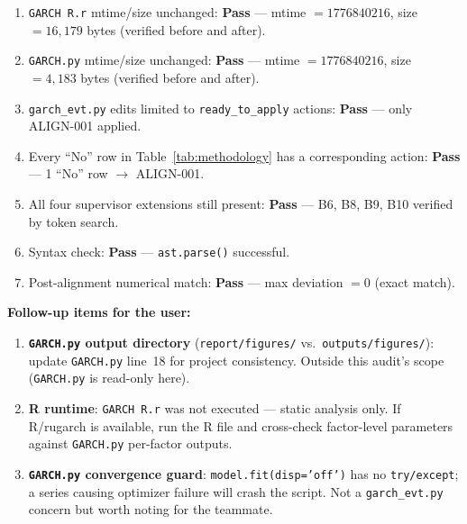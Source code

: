 \documentclass[11pt,a4paper]{article}
\newcommand{\code}[1]{\texttt{#1}}
\begin{document}
\begin{enumerate}
  \item \code{GARCH R.r} mtime/size unchanged: \textbf{Pass} ---
    mtime $= 1776840216$, size $= 16{,}179$ bytes (verified before and after).
  \item \code{GARCH.py} mtime/size unchanged: \textbf{Pass} ---
    mtime $= 1776840216$, size $= 4{,}183$ bytes (verified before and after).
  \item \code{garch\_evt.py} edits limited to \texttt{ready\_to\_apply}
    actions: \textbf{Pass} --- only ALIGN-001 applied.
  \item Every ``No'' row in Table~\ref{tab:methodology} has a corresponding
    action: \textbf{Pass} --- 1 ``No'' row $\to$ ALIGN-001.
  \item All four supervisor extensions still present: \textbf{Pass} ---
    B6, B8, B9, B10 verified by token search.
  \item Syntax check: \textbf{Pass} --- \code{ast.parse()} successful.
  \item Post-alignment numerical match: \textbf{Pass} ---
    max deviation $= 0$ (exact match).
\end{enumerate}

\textbf{Follow-up items for the user:}
\begin{enumerate}
  \item \textbf{\code{GARCH.py} output directory} (\code{report/figures/}
    vs.\ \code{outputs/figures/}): update \code{GARCH.py} line~18 for
    project consistency. Outside this audit's scope (\code{GARCH.py} is
    read-only here).
  \item \textbf{R runtime}: \code{GARCH R.r} was not executed --- static
    analysis only. If R/rugarch is available, run the R file and cross-check
    factor-level parameters against \code{GARCH.py} per-factor outputs.
  \item \textbf{\code{GARCH.py} convergence guard}: \code{model.fit(disp='off')}
    has no \code{try/except}; a series causing optimizer failure will crash
    the script. Not a \code{garch\_evt.py} concern but worth noting for the
    teammate.
\end{enumerate}
\end{document}
